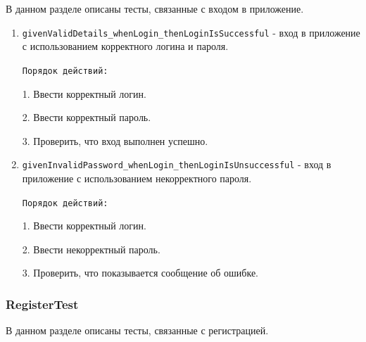\documentclass[a4paper, 14pt]{article}
\begin{document}
В данном разделе описаны тесты, связанные с входом в приложение.

\begin{enumerate}
    \item \texttt{givenValidDetails\_whenLogin\_thenLoginIsSuccessful} - вход в приложение с использованием корректного логина и пароля.

    \texttt{Порядок действий:}
    
    1. Ввести корректный логин.
    
    2. Ввести корректный пароль.

    3. Проверить, что вход выполнен успешно.
    \item \texttt{givenInvalidPassword\_whenLogin\_thenLoginIsUnsuccessful} - вход в приложение с использованием некорректного пароля.

    \texttt{Порядок действий:}
    
    1. Ввести корректный логин.
    
    2. Ввести некорректный пароль.

    3. Проверить, что показывается сообщение об ошибке.
\end{enumerate}

\subsubsection{RegisterTest}

В данном разделе описаны тесты, связанные с регистрацией.
\end{document}

